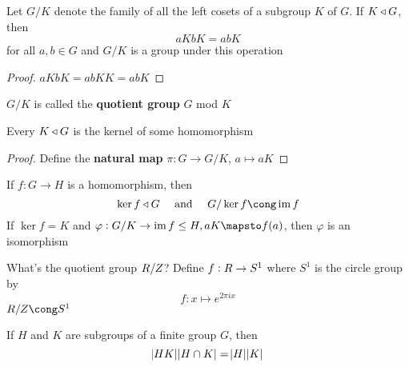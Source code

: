 \documentclass[11pt]{article}
\begin{document}
\begin{theorem}[]
Let \(G/K\) denote the family of all the left cosets of a subgroup \(K\) of \(G\).
If \(K\triangleleft G\), then
\begin{equation*}
aKbK=abK
\end{equation*}
for all \(a,b\in G\) and \(G/K\) is a group under this operation
\end{theorem}

\begin{proof}
\(aKbK=abKK=abK\)
\end{proof}

\(G/K\) is called the \textbf{quotient group} \(G\) mod \(K\)

\begin{corollary}[]
Every \(K\triangleleft G\) is the kernel of some homomorphism
\end{corollary}

\begin{proof}
Define the \textbf{natural map} \(\pi:G\to G/K\), \(a\mapsto aK\)
\end{proof}

\begin{theorem}
If \(f:G\to H\) is a homomorphism, then
\begin{equation*}
\ker f\tril G\quad\text{ and }\quad G/\ker f\cong\im f
\end{equation*}
If \(\ker f=K\) and \(\varphi:G/K\to\im f\le H,aK\mapsto f(a)\), then \(\varphi\)
is an isomorphism
\end{theorem}

\begin{remark}
\begin{center}
\end{center}
\end{remark}

\begin{examplle}[]
What's the quotient group \(\relax{R}/\relax{Z}\)? Define \(f:\relax{R}\to S^1\) where \(S^1\) is the
circle group by
\begin{equation*}
f:x\mapsto e^{2\pi ix}
\end{equation*}
\(\R/\Z\cong S^1\)
\end{examplle}

\begin{proposition}
If \(H\) and \(K\) are subgroups of a finite group \(G\), then
\begin{equation*}
\abs{HK}\abs{H\cap K}=\abs{H}\abs{K}
\end{equation*}
\end{proposition}
\end{document}
